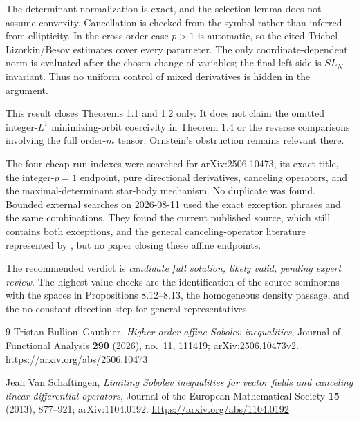 \documentclass[11pt]{article}
\begin{document}
The determinant normalization is exact, and the selection lemma does not
assume convexity.  Cancellation is checked from the symbol rather than
inferred from ellipticity.  In the cross-order case \(p>1\) is automatic, so
the cited Triebel--Lizorkin/Besov estimates cover every parameter.  The only
coordinate-dependent norm is evaluated after the chosen change of variables;
the final left side is \(SL_N\)-invariant.  Thus no uniform control of mixed
derivatives is hidden in the argument.

This result closes Theorems 1.1 and 1.2 only.  It does not claim the omitted
integer-\(L^1\) minimizing-orbit coercivity in Theorem 1.4 or the reverse
comparisons involving the full order-\(m\) tensor.  Ornstein's obstruction
remains relevant there.

The four cheap run indexes were searched for arXiv:2506.10473, its exact
title, the integer-\(p=1\) endpoint, pure directional derivatives, canceling
operators, and the maximal-determinant star-body mechanism.  No duplicate was
found.  Bounded external searches on 2026-08-11 used the exact exception
phrases and the same combinations.  They found the current published source,
which still contains both exceptions, and the general canceling-operator
literature represented by \cite{VS}, but no paper closing these affine
endpoints.

The recommended verdict is \emph{candidate full solution, likely valid,
pending expert review}.  The highest-value checks are the identification of
the source seminorms with the spaces in Propositions 8.12--8.13, the
homogeneous density passage, and the no-constant-direction step for general
representatives.

\begin{thebibliography}{9}
Tristan Bullion--Gauthier,
\emph{Higher-order affine Sobolev inequalities},
Journal of Functional Analysis \textbf{290} (2026), no.~11, 111419;
arXiv:2506.10473v2.
\url{https://arxiv.org/abs/2506.10473}

Jean Van Schaftingen,
\emph{Limiting Sobolev inequalities for vector fields and canceling linear
differential operators},
Journal of the European Mathematical Society \textbf{15} (2013), 877--921;
arXiv:1104.0192.
\url{https://arxiv.org/abs/1104.0192}
\end{thebibliography}
\end{document}
